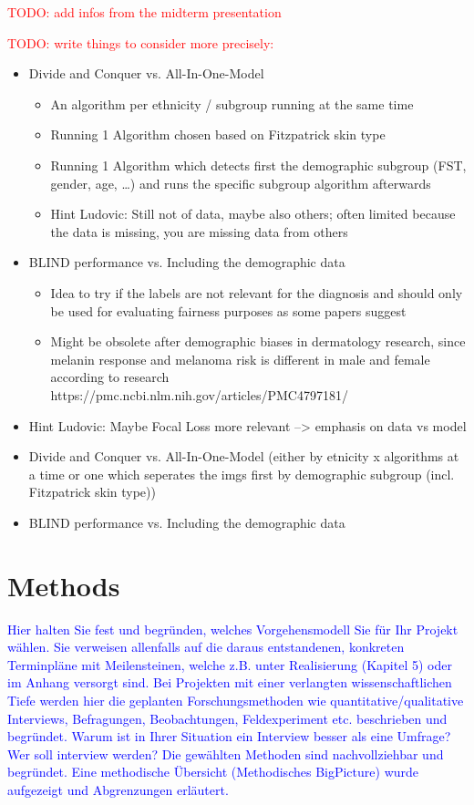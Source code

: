 \documentclass[12pt, a4paper, oneside]{book}   	%
\renewcommand{\todo}[1]{\textcolor{red}{TODO: #1}}
\newcommand{\baaCriteria}[1]{\textcolor{blue}{#1}}
\begin{document}
		
			\todo{add infos from the midterm presentation}
		
			\todo{write things to consider more precisely:}
			\begin{itemize}
				\item Divide and Conquer vs. All-In-One-Model
				\begin{itemize}
					 \item An algorithm per ethnicity / subgroup running at the same time
					\item Running 1 Algorithm chosen based on Fitzpatrick skin type
					\item Running 1 Algorithm which detects first the demographic subgroup (\gls{FST}, gender, age, …) and runs the specific subgroup algorithm afterwards
					\item Hint Ludovic: Still not of data, maybe also others; often limited because the data is missing, you are missing data from others
				\end{itemize}
				\item BLIND performance vs. Including the demographic data
				\begin{itemize}
					\item Idea to try if the labels are not relevant for the diagnosis and should only be used for evaluating fairness purposes as some papers suggest 
					\item Might be obsolete after demographic biases in dermatology research, since melanin response and melanoma risk is different in male and female according to research https://pmc.ncbi.nlm.nih.gov/articles/PMC4797181/
				\end{itemize}
				\item Hint Ludovic: Maybe Focal Loss more relevant --> emphasis on data vs model
			\end{itemize}
			\begin{itemize}
				\item Divide and Conquer vs. All-In-One-Model (either by etnicity x algorithms at a time or one which seperates the imgs first by demographic subgroup (incl. Fitzpatrick skin type))
				\item BLIND performance vs. Including the demographic data
			\end{itemize}

	\chapter{Methods}\label{chap:methodology}
		\baaCriteria{Hier halten Sie fest und begründen, welches Vorgehensmodell Sie für Ihr Projekt wählen. Sie verweisen allenfalls auf die daraus entstandenen, konkreten Terminpläne mit Meilensteinen, welche z.B. unter Realisierung (Kapitel 5) oder im Anhang versorgt sind. Bei Projekten mit einer verlangten wissenschaftlichen Tiefe werden hier die geplanten Forschungsmethoden wie quantitative/qualitative Interviews, Befragungen, Beobachtungen, Feldexperiment etc. beschrieben und begründet. Warum ist in Ihrer Situation ein Interview besser als eine Umfrage? Wer soll interview werden?}
		\baaCriteria{Die gewählten Methoden sind nachvollziehbar und begründet. Eine methodische Übersicht (Methodisches BigPicture) wurde aufgezeigt und Abgrenzungen erläutert.}
		
\end{document}
